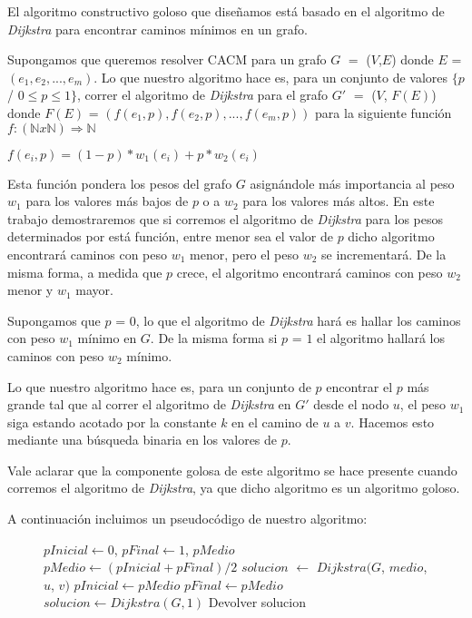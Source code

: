 El algoritmo constructivo goloso que diseñamos está basado en el algoritmo de \emph{Dijkstra} para encontrar caminos mínimos en un grafo. 

Supongamos que queremos resolver CACM para un grafo $G$ $=$ ($V$,$E$) donde $E$ = $(e_1, e_2, ..., e_m)$. Lo que nuestro algoritmo hace es, para un conjunto de valores $\{p$ / $0 \leq p \leq 1\}$, correr el algoritmo de \emph{Dijkstra} para el grafo $G'$ $=$ ($V$, $F(E)$) donde $F(E)$ = $(f(e_1,p), f(e_2,p), ...,f(e_m,p))$ para la siguiente función $f: (\mathbb{N} x \mathbb{N}) \Rightarrow \mathbb{N}$

$f(e_i,p) = (1-p)*w_1(e_i) + p*w_2(e_i)$

Esta función pondera los pesos del grafo $G$ asignándole más importancia al peso $w_1$ para los valores más bajos de $p$ o a $w_2$ para los valores más altos. En este trabajo demostraremos que si corremos el algoritmo de \emph{Dijkstra} para los pesos determinados por está función, entre menor sea el valor de $p$ dicho algoritmo encontrará caminos con peso $w_1$ menor, pero el peso $w_2$ se incrementará. De la misma forma, a medida que $p$ crece, el algoritmo encontrará caminos con peso $w_2$ menor y $w_1$ mayor.

Supongamos que $p$ = $0$, lo que el algoritmo de \emph{Dijkstra} hará es hallar los caminos con peso $w_1$ mínimo en $G$. De la misma forma si $p$ = $1$ el algoritmo hallará los caminos con peso $w_2$ mínimo.

Lo que nuestro algoritmo hace es, para un conjunto de $p$ encontrar el $p$ más grande tal que al correr el algoritmo de \emph{Dijkstra} en $G'$ desde el nodo $u$, el peso $w_1$ siga estando acotado por la constante $k$ en el camino de $u$ a $v$. Hacemos esto mediante una búsqueda binaria en los valores de $p$.

Vale aclarar que la componente golosa de este algoritmo se hace presente cuando corremos el algoritmo de \emph{Dijkstra}, ya que dicho algoritmo es un algoritmo goloso.

A continuación incluimos un pseudocódigo de nuestro algoritmo:

\begin{center}
 \begin{figure}[H]
  \begin{pseudo}
    \State $pInicial \leftarrow 0$, $pFinal \leftarrow 1$, $pMedio$
      \State $pMedio \leftarrow (pInicial + pFinal)/2$
      \State $solucion$ $\leftarrow$ $Dijkstra(G$, $medio$, $u$, $v)$
	 \State $pInicial \leftarrow pMedio$
      \Else
	 \State $pFinal \leftarrow pMedio$
      \EndIf
    \EndFor
      \State $solucion \leftarrow Dijkstra(G, 1)$
    \EndIf
    \State Devolver solucion
   \EndProcedure
  \end{pseudo}
 \end{figure}
\end{center}

